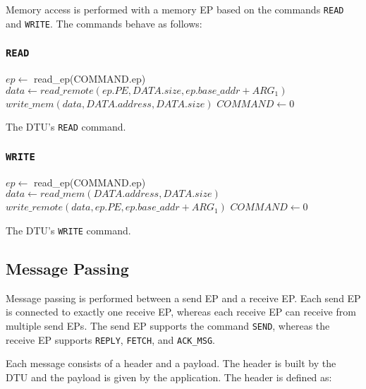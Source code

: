 \documentclass[a4paper,11pt,draft]{article}
\begin{document}
Memory access is performed with a memory EP based on the commands \texttt{READ} and \texttt{WRITE}. The commands behave as follows:

\subsubsection{\texttt{READ}}

\begin{algorithm}[H]
    $ep \gets$ read\_ep(COMMAND.ep)\;
    \BlankLine
    $data \gets read\_remote(ep.PE, DATA.size, ep.base\_addr + ARG_1)$\;
    $write\_mem(data, DATA.address, DATA.size)$\;
    \BlankLine
    $COMMAND \gets 0$\;
    \caption{The DTU's \texttt{READ} command.}
\end{algorithm}

\subsubsection{\texttt{WRITE}}

\begin{algorithm}[H]
    $ep \gets$ read\_ep(COMMAND.ep)\;
    \BlankLine
    $data \gets read\_mem(DATA.address, DATA.size)$\;
    $write\_remote(data, ep.PE, ep.base\_addr + ARG_1)$\;
    \BlankLine
    $COMMAND \gets 0$\;
    \caption{The DTU's \texttt{WRITE} command.}
\end{algorithm}

\subsection{Message Passing}

Message passing is performed between a send EP and a receive EP. Each send EP is connected to
exactly one receive EP, whereas each receive EP can receive from multiple send EPs. The send EP
supports the command \texttt{SEND}, whereas the receive EP supports \texttt{REPLY}, \texttt{FETCH},
and \texttt{ACK\_MSG}.

Each message consists of a header and a payload. The header is built by the DTU and the payload is
given by the application. The header is defined as:
\end{document}
